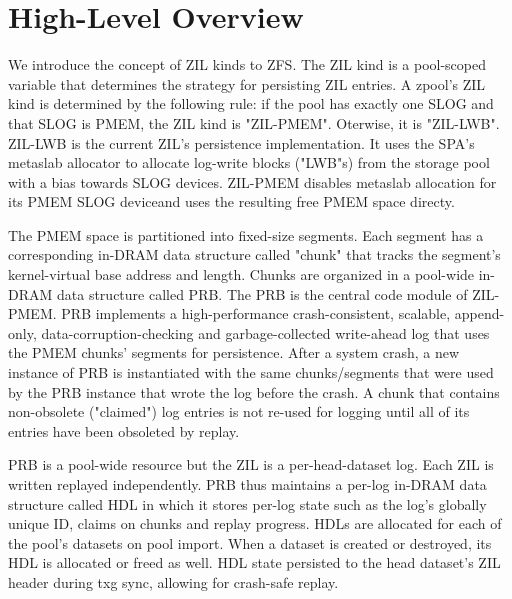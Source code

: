 \documentclass[12pt,a4paper,twoside,draft]{book}
\begin{document}
\section{High-Level Overview}
We introduce the concept of ZIL kinds to ZFS.
The ZIL kind is a pool-scoped variable that determines the strategy for persisting ZIL entries.
A zpool's ZIL kind is determined by the following rule:
if the pool has exactly one SLOG and that SLOG is PMEM, the ZIL kind is "ZIL-PMEM". Oterwise, it is "ZIL-LWB".
ZIL-LWB is the current ZIL's persistence implementation. It uses the SPA's metaslab allocator to allocate log-write blocks ("LWB"s) from the storage pool with a bias towards SLOG devices.
ZIL-PMEM disables metaslab allocation for its PMEM SLOG deviceand uses the resulting free PMEM space directy.

The PMEM space is partitioned into fixed-size segments.
Each segment has a corresponding in-DRAM data structure called "chunk" that tracks the segment's kernel-virtual base address and length.
Chunks are organized in a pool-wide in-DRAM data structure called PRB.
The PRB is the central code module of ZIL-PMEM.
PRB implements a high-performance crash-consistent, scalable, append-only, data-corruption-checking and garbage-collected write-ahead log that uses the PMEM chunks' segments for persistence.
After a system crash, a new instance of PRB is instantiated with the same chunks/segments that were used by the PRB instance that wrote the log before the crash.
A chunk that contains non-obsolete ("claimed") log entries is not re-used for logging until all of its entries have been obsoleted by replay.

PRB is a pool-wide resource but the ZIL is a per-head-dataset log.
Each ZIL is written replayed independently.
PRB thus maintains a per-log in-DRAM data structure called HDL in which it stores per-log state such as the log's globally unique ID, claims on chunks and replay progress.
HDLs are allocated for each of the pool's datasets on pool import.
When a dataset is created or destroyed, its HDL is allocated or freed as well.
HDL state persisted to the head dataset's ZIL header during txg sync, allowing for crash-safe replay.
\end{document}
